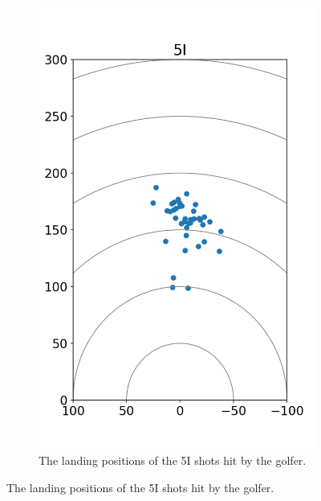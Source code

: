 \documentclass{kththesis}
\begin{document}
\begin{figure}
\begin{subfigure}{0.4\textwidth}
    \includegraphics[height=0.4\textheight]{Shots/5I_shots.png} 
    \caption{The landing positions of the 5I shots hit by the golfer.}
    \label{fig:5I_shots}
    \end{subfigure}
\end{figure}
\end{document}
